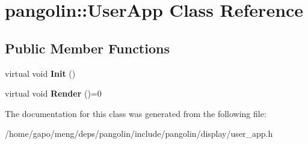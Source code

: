 \hypertarget{classpangolin_1_1_user_app}{}\section{pangolin\+:\+:User\+App Class Reference}
\label{classpangolin_1_1_user_app}
\subsection*{Public Member Functions}
\begin{DoxyCompactItemize}
\item 
virtual void {\bfseries Init} ()\hypertarget{classpangolin_1_1_user_app_abb040aec7a17b8ab2d6a028f89bb4213}{}\label{classpangolin_1_1_user_app_abb040aec7a17b8ab2d6a028f89bb4213}

\item 
virtual void {\bfseries Render} ()=0\hypertarget{classpangolin_1_1_user_app_a772ec714cbbd97530edfe99329879469}{}\label{classpangolin_1_1_user_app_a772ec714cbbd97530edfe99329879469}

\end{DoxyCompactItemize}


The documentation for this class was generated from the following file\+:\begin{DoxyCompactItemize}
\item 
/home/gapo/meng/deps/pangolin/include/pangolin/display/user\+\_\+app.\+h\end{DoxyCompactItemize}
